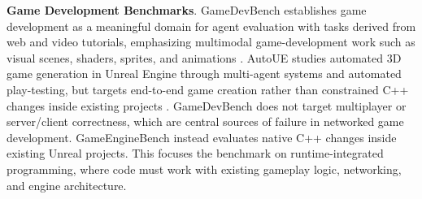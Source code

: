 \documentclass[11pt]{article}
\newcommand{\benchmarkname}{GameEngineBench\xspace}
\begin{document}
\textbf{Game Development Benchmarks}. GameDevBench establishes game development as a meaningful domain for agent evaluation with tasks derived from web and video tutorials, emphasizing multimodal game-development work such as visual scenes, shaders, sprites, and animations \citep{chi2026gamedevbench}. AutoUE studies automated 3D game generation in Unreal Engine through multi-agent systems and automated play-testing, but targets end-to-end game creation rather than constrained C++ changes inside existing projects \citep{yin2026autoue}. GameDevBench does not target multiplayer or server/client correctness, which are central sources of failure in networked game development. \benchmarkname instead evaluates native C++ changes inside existing Unreal projects. This focuses the benchmark on runtime-integrated programming, where code must work with existing gameplay logic, networking, and engine architecture.
\end{document}
